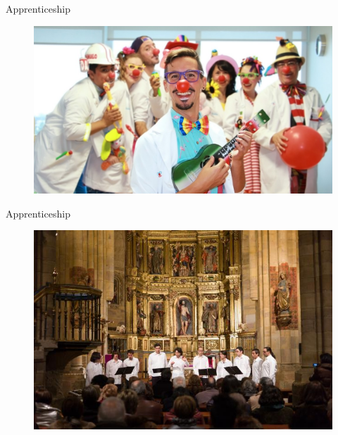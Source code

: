 \documentclass{beamer}
\begin{document}
\begin{frame}{Apprenticeship}
    \begin{figure}[h]
        \includegraphics[width=\textwidth]{payasos.jpg}
    \end{figure}
\end{frame}

\begin{frame}{Apprenticeship}
    \begin{figure}[h]
        \includegraphics[width=\textwidth]{coro.jpeg}
    \end{figure}
\end{frame}
\end{document}
